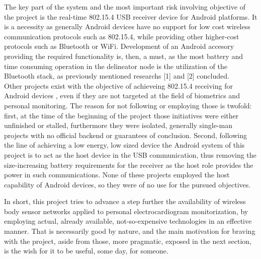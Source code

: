 		The key part of the system and the most important risk involving objective of the project is the real-time 802.15.4 USB receiver device for Android platforms. It is a necessity as generally Android devices have no support for low cost wireless communication protocols such as 802.15.4, while providing other higher-cost protocols such as Bluetooth or WiFi. Development of an Android accesory providing the required functionality is, then, a must, as the most battery and time consuming operation in the delineator node is the utilization of the Bluetooth stack, as previously mentioned researchs [1] and [2] concluded.\\

		Other projects exist with the objective of achieveing 802.15.4 receiving for Android devices , even if they are not targeted at the field of biometrics and personal monitoring. The reason for not following or employing those is twofold: 
		first, at the time of the beginning of the project those initiatives were either unfinished or stalled, furthermore they were isolated, generally single-man projects with no official backend or guarantees of conclusion.
		Second, following the line of achieving a low energy, low sized device the Android system of this project is to act as the host device in the USB communication, thus removing the size-increasing battery requirements for the receiver as the host role provides the power in such communications. None of these projects employed the host capability of Android devices, so they were of no use for the pursued objectives.\\


		In short, this project tries to advance a step further the availability of wireless body sensor networks applied to personal electrocardiogram monitorization, by employing actual, already available, not-so-expensive technologies in an effective manner. That is necessarily good by nature, and the main motivation for braving with the project, aside from those, more pragmatic, exposed in the next section, is the wish for it to be useful, some day, for someone.


